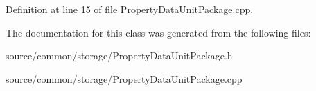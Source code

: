 Definition at line 15 of file Property\-Data\-Unit\-Package.\-cpp.



The documentation for this class was generated from the following files\-:\begin{DoxyCompactItemize}
\item 
source/common/storage/Property\-Data\-Unit\-Package.\-h\item 
source/common/storage/Property\-Data\-Unit\-Package.\-cpp\end{DoxyCompactItemize}

